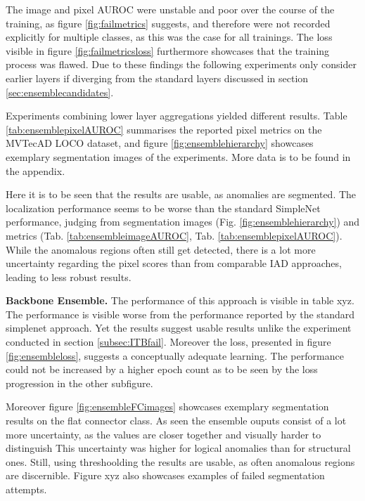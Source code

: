 

The image and pixel AUROC were unstable and poor over the course of the training, 
as figure \ref{fig:failmetrics} suggests, and therefore were not recorded explicitly for multiple classes, as this was the case for all trainings. The loss visible in figure \ref{fig:failmetricsloss} furthermore 
showcases that the training process was flawed. Due to these findings the following experiments only consider earlier layers if diverging from the standard layers 
discussed in section \ref{sec:ensemblecandidates}.




Experiments combining lower layer aggregations yielded different results. Table \ref{tab:ensemblepixelAUROC} summarises the reported pixel metrics on the MVTecAD LOCO \cite{LOCODentsAndScratchesBergmann2022} 
dataset, and figure \ref{fig:ensemblehierarchy} showcases exemplary 
segmentation images of the experiments. More data is to be found in the appendix.



Here it is to be seen that the results are usable, as anomalies are segmented. The localization performance seems to be worse than the standard SimpleNet \cite{liu2023simplenet} 
performance, judging from segmentation images (Fig. \ref{fig:ensemblehierarchy}) and metrics (Tab. \ref{tab:ensembleimageAUROC}, Tab. \ref{tab:ensemblepixelAUROC}). While the anomalous regions often still get detected, there is a lot more uncertainty regarding 
the pixel scores than from comparable IAD approaches, leading to less robust results.



\textbf{Backbone Ensemble.} The performance of this approach is visible in table xyz. The performance is visible worse from the performance 
reported by the standard simplenet approach. Yet the results suggest usable results unlike the experiment conducted in section \ref{subsec:ITBfail}. 
Moreover the loss, presented in figure \ref{fig:ensembleloss}, suggests a conceptually adequate learning. The performance could not be increased by a higher 
epoch count as to be seen by the loss progression in the other subfigure.



Moreover figure \ref{fig:ensembleFCimages} showcases exemplary segmentation results on the flat connector class. As 
seen the ensemble ouputs consist of a lot more uncertainty, as the values are closer together and visually harder to distinguish This uncertainty 
was higher for logical anomalies than for structural ones. Still, 
using threshoolding the results are usable, as often anomalous regions are discernible. Figure xyz also showcases examples of failed segmentation 
attempts. 

